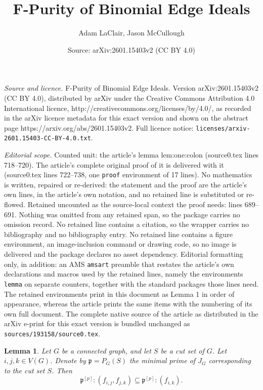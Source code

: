 \documentclass[10pt,a4paper]{amsart}
\title{F-Purity of Binomial Edge Ideals}
\author{Adam LaClair, Jason McCullough}
\date{Source: arXiv:2601.15403v2 (CC BY 4.0)}
\newtheorem{lemma}{Lemma}
\def\p{\mathfrak{p}}
\begin{document}
\maketitle

\noindent\emph{Source and licence.} F-Purity of Binomial Edge Ideals. Version arXiv:2601.15403v2 (CC BY 4.0), distributed by arXiv under the Creative Commons Attribution 4.0 International licence, http://creativecommons.org/licenses/by/4.0/, as recorded in the arXiv licence metadata for this exact version and shown on the abstract page https://arxiv.org/abs/2601.15403v2. Full licence notice: \texttt{licenses/arxiv-2601.15403-CC-BY-4.0.txt}.\par\smallskip

\noindent\textit{Editorial scope.} Counted unit: the article's lemma lem:one:colon (source0.tex lines 718--720). The article's complete original proof of it is delivered with it (source0.tex lines 722--738, one \texttt{proof} environment of 17 lines). No mathematics is written, repaired or re-derived: the statement and the proof are the article's own lines, in the article's own notation, and no retained line is substituted or re-flowed.  Retained uncounted as the source-local context the proof needs: lines 689--691.  Nothing was omitted from any retained span, so the package carries no omission record.  No retained line contains a citation, so the wrapper carries no bibliography and no bibliography entry.  No retained line contains a figure environment, an image-inclusion command or drawing code, so no image is delivered and the package declares no asset dependency.  Editorial formatting only, in addition: an AMS \texttt{amsart} preamble that restates the article's own declarations and macros used by the retained lines, namely the environments \texttt{lemma} on separate counters, together with the standard packages those lines need.  The retained environments print in this document as Lemma 1 in order of appearance, whereas the article prints the same items with the numbering of its own full document.  The complete native source of the article as distributed in the arXiv e-print for this exact version is bundled unchanged as \texttt{sources/193158/source0.tex}.
\begin{lemma}\label{lem:swap}
Let $G$ be a connected graph, and let $S$ be a cut set of $G$. Let $i,j,k \in V(G)$. Denote by $\p = P_G(S)$ the minimal prime of $J_{G}$ corresponding to the cut set $S$. Then $$\p^{[p]}:(f_{i,j},f_{j,k}) \subseteq \p^{[p]}:(f_{i,k}).$$
\end{lemma}
\end{document}
